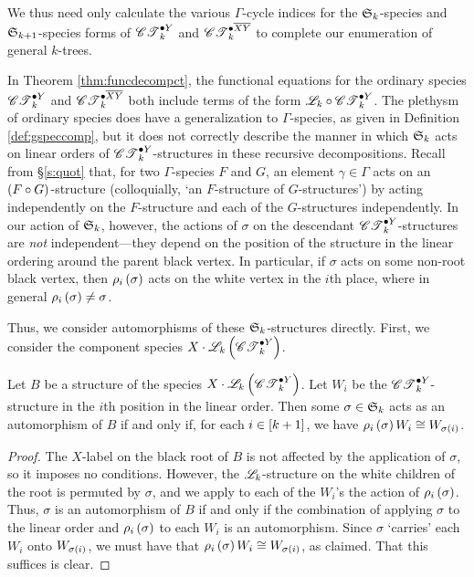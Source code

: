 \documentclass[sectionflow,singlespace,twoside,boldmathhdr,draft]{brandiss} %
\numberwithin{section}{chapter}
\numberwithin{figure}{chapter}
\begin{document}
We thus need only calculate the various $\Gamma$-cycle indices for the $\symgp{k}$-species and $\symgp{k+1}$-species forms of $\pointed[Y]{\specname{CT}}_{k}$ and $\pointed[\overline{XY}]{\specname{CT}}_{k}$ to complete our enumeration of general $k$-trees.

In Theorem \ref{thm:funcdecompct}, the functional equations for the ordinary species $\pointed[Y]{\specname{CT}}_{k}$ and $\pointed[\overline{XY}]{\specname{CT}}_{k}$ both include terms of the form $\specname{L}_{k} \circ \pointed[Y]{\specname{CT}}_{k}$.
The plethysm of ordinary species does have a generalization to $\Gamma$-species, as given in Definition \ref{def:gspeccomp}, but it does not correctly describe the manner in which $\symgp{k}$ acts on linear orders of $\pointed[Y]{\specname{CT}}_{k}$-structures in these recursive decompositions.
Recall from \S \ref{s:quot} that, for two $\Gamma$-species $F$ and $G$, an element $\gamma \in \Gamma$ acts on an $\pbrac{F \circ G}$-structure (colloquially, `an $F$-structure of $G$-structures') by acting independently on the $F$-structure and each of the $G$-structures independently.
In our action of $\symgp{k}$, however, the actions of $\sigma$ on the descendant $\pointed[Y]{\specname{CT}}_{k}$-structures are \emph{not} independent---they depend on the position of the structure in the linear ordering around the parent black vertex.
In particular, if $\sigma$ acts on some non-root black vertex, then $\rho_{i} \pbrac{\sigma}$ acts on the white vertex in the $i$th place, where in general $\rho_{i} \pbrac{\sigma} \neq \sigma$.

Thus, we consider automorphisms of these $\symgp{k}$-structures directly.
First, we consider the component species $X \cdot \specname{L}_{k} \pbrac{\pointed[Y]{\specname{CT}}_{k}}$.
\begin{lemma}
  \label{lem:ctyinvar}
  Let $B$ be a structure of the species $X \cdot \specname{L}_{k} \pbrac{\pointed[Y]{\specname{CT}}_{k}}$.
  Let $W_{i}$ be the $\pointed[Y]{\specname{CT}}_{k}$-structure in the $i$th position in the linear order.
  Then some $\sigma \in \symgp{k}$ acts as an automorphism of $B$ if and only if, for each $i \in \sbrac{k+1}$, we have $\rho_{i} \pbrac{\sigma} W_{i} \cong W_{\sigma \pbrac{i}}$.
\end{lemma}

\begin{proof}
  The $X$-label on the black root of $B$ is not affected by the application of $\sigma$, so it imposes no conditions.
  However, the $\specname{L}_{k}$-structure on the white children of the root is permuted by $\sigma$, and we apply to each of the $W_{i}$'s the action of $\rho_{i} \pbrac{\sigma}$.
  Thus, $\sigma$ is an automorphism of $B$ if and only if the combination of applying $\sigma$ to the linear order and $\rho_{i} \pbrac{\sigma}$ to each $W_{i}$ is an automorphism.
  Since $\sigma$ `carries' each $W_{i}$ onto $W_{\sigma \pbrac{i}}$, we must have that $\rho_{i} \pbrac{\sigma} W_{i} \cong W_{\sigma \pbrac{i}}$, as claimed.
  That this suffices is clear.
\end{proof}
\end{document}

